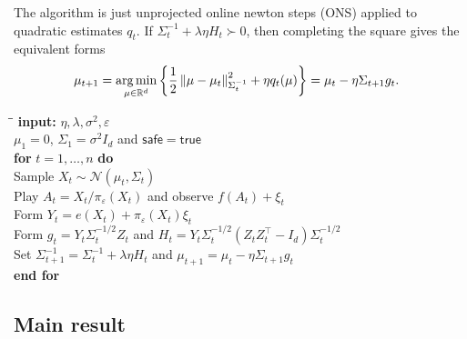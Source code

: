 \documentclass{article}
\newcommand{\R}{\mathbb R}
\newcommand{\N}{\mathcal N}
\newcommand{\argmin}{\operatornamewithlimits{arg\,min}}
\newcommand{\1}{\mathbf 1}
\newcommand{\eps}{\varepsilon}
\newcommand{\normm}[2]{\left\lVert #1\right\rVert_{#2}}
\begin{document}
The algorithm is just unprojected online newton steps (ONS) applied to quadratic estimates $q_t$.
If $\Sigma_t^{-1}+\lambda\eta H_t\succ0$,
then completing the square gives the equivalent forms
\begin{align}
    \mu_{t+1}
     & =\argmin_{\mu\in\R^d}
    \left\{
    \frac12\normm{\mu-\mu_t}{\Sigma_t^{-1}}^2
    +\eta q_t(\mu)
    \right\}
    =\mu_t-\eta\Sigma_{t+1}g_t.
    \label{eq:projected-ons-update}
\end{align}
\begin{algorithm}[!t]
    \caption{Direct Hermite--ONS algorithm}
    \label{alg:direct-hermite}
    \small
    \begin{tabbing}
        \qquad\=\qquad\=\kill
        \textbf{input:} $\eta,\lambda,\sigma^2,\eps$\\
        $\mu_1=0$, $\Sigma_1=\sigma^2I_d$ and $\mathsf{safe}=\mathsf{true}$\\[1mm]
        \textbf{for} $t=1,\ldots,n$ \textbf{do}\\
        \>Sample $X_t\sim\N(\mu_t,\Sigma_t)$\\
        \>Play $A_t=X_t/\pi_\eps(X_t)$ and observe $f(A_t)+\xi_t$\\
        \>Form $Y_t=e(X_t) + \pi_\eps(X_t) \xi_t$\\
        \>Form $g_t = Y_t\Sigma_t^{-1/2}Z_t$ and $H_t = Y_t\Sigma_t^{-1/2}(Z_tZ_t^\top-I_d)\Sigma_t^{-1/2}$\\
        \>Set $\Sigma_{t+1}^{-1}=\Sigma_t^{-1}+\lambda\eta H_t$ and $\mu_{t+1} =\mu_t-\eta\Sigma_{t+1}g_t$\\
        \textbf{end for}
    \end{tabbing}
\end{algorithm}

\subsection{Main result}
\end{document}
